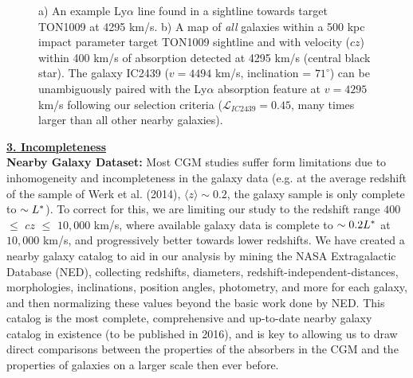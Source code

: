 \documentclass[12pt]{article}
\begin{document}
\begin{figure}[t!]
\begin{subfigure}[t]{0.5\textwidth}
        \caption{}
    \end{subfigure}
  \caption{\small{a) An example Ly$\alpha$ line found in a sightline towards target TON1009 at 4295 km/s. b) A map of \textit{all} galaxies within a 500 kpc impact parameter target TON1009 sightline and with velocity ($cz$) within 400 km/s of absorption detected at 4295 km/s (central black star). The galaxy IC2439 ($v=4494$ km/s, inclination = $71^{\circ}$) can be unambiguously paired with the Ly$\alpha$ absorption feature at $v=4295$ km/s following our selection criteria ($\mathcal{L}_{IC2439} = 0.45$, many times larger than all other nearby galaxies).}}
  \vspace{-10pt}
\end{figure}





\noindent \textbf{\underline{3. Incompleteness}}\\


\textbf{Nearby Galaxy Dataset:} Most CGM studies suffer form limitations due to inhomogeneity and incompleteness in the galaxy data (e.g. at the average redshift of the sample of Werk et al. (2014), $\langle z \rangle \sim 0.2$, the galaxy sample is only complete to $\sim L^{\**}$). To correct for this, we are limiting our study to the redshift range $400$ $\leq$ $cz$ $\leq$ $10,000$ km/s, where available galaxy data is complete to $\sim0.2 L^{\**}$ at $10,000$ km/s, and progressively better towards lower redshifts. We have created a nearby galaxy catalog to aid in our analysis by mining the NASA Extragalactic Database (NED), collecting redshifts, diameters, redshift-independent-distances, morphologies, inclinations, position angles, photometry, and more for each galaxy, and then normalizing these values beyond the basic work done by NED. This catalog is the most complete, comprehensive and up-to-date nearby galaxy catalog in existence (to be published in 2016), and is key to allowing us to draw direct comparisons between the properties of the absorbers in the CGM and the properties of galaxies on a larger scale then ever before.\\
\end{document}
